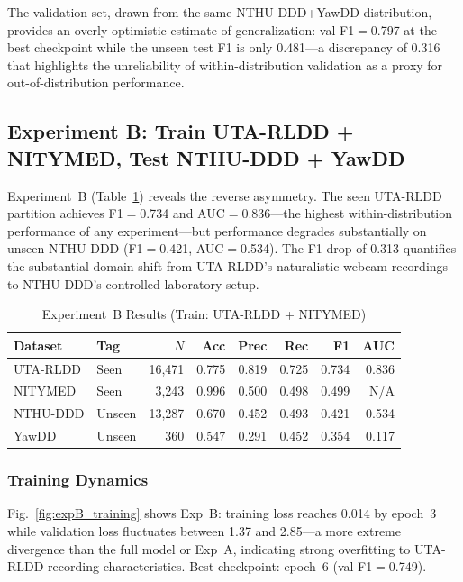 \documentclass[journal]{IEEEtran}
\begin{document}
The validation set, drawn from the same NTHU-DDD+YawDD distribution, provides an overly optimistic estimate of generalization: val-F1$=$0.797 at the best checkpoint while the unseen test F1 is only 0.481---a discrepancy of 0.316 that highlights the unreliability of within-distribution validation as a proxy for out-of-distribution performance.

\subsection{Experiment B: Train UTA-RLDD + NITYMED, Test NTHU-DDD + YawDD}
\label{sec:expB}

Experiment~B (Table~\ref{tab:expB}) reveals the reverse asymmetry. The seen UTA-RLDD partition achieves F1$=$0.734 and AUC$=$0.836---the highest within-distribution performance of any experiment---but performance degrades substantially on unseen NTHU-DDD (F1$=$0.421, AUC$=$0.534). The F1 drop of 0.313 quantifies the substantial domain shift from UTA-RLDD's naturalistic webcam recordings to NTHU-DDD's controlled laboratory setup.

\begin{table}[t]
  \caption{Experiment~B Results (Train: UTA-RLDD + NITYMED)}
  \label{tab:expB}
  \centering
  \small
  \setlength{\tabcolsep}{3pt}
  \begin{tabular}{llrrrrrr}
    \toprule
    Dataset & Tag & $N$ & Acc & Prec & Rec & F1 & AUC \\
    \midrule
    UTA-RLDD & Seen   & 16{,}471 & 0.775 & 0.819 & 0.725 & 0.734 & 0.836 \\
    NITYMED  & Seen   & 3{,}243  & 0.996 & 0.500 & 0.498 & 0.499 & N/A  \\
    NTHU-DDD & Unseen & 13{,}287 & 0.670 & 0.452 & 0.493 & 0.421 & 0.534 \\
    YawDD    & Unseen & 360      & 0.547 & 0.291 & 0.452 & 0.354 & 0.117 \\
    \bottomrule
  \end{tabular}
\end{table}

\subsubsection{Training Dynamics}
Fig.~\ref{fig:expB_training} shows Exp~B: training loss reaches 0.014 by epoch~3 while validation loss fluctuates between 1.37 and 2.85---a more extreme divergence than the full model or Exp~A, indicating strong overfitting to UTA-RLDD recording characteristics. Best checkpoint: epoch~6 (val-F1$=$0.749).
\end{document}
